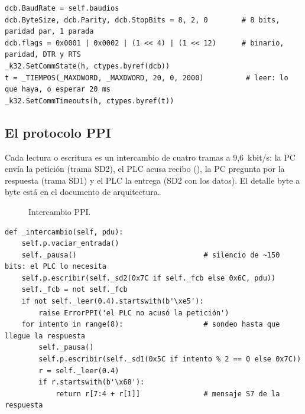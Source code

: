 \documentclass[a4paper,11pt]{article}
\begin{document}
\begin{lstlisting}[style=py, caption={Configuración del puerto en Windows por ctypes (\texttt{serie.py}).}]
dcb.BaudRate = self.baudios
dcb.ByteSize, dcb.Parity, dcb.StopBits = 8, 2, 0        # 8 bits, paridad par, 1 parada
dcb.flags = 0x0001 | 0x0002 | (1 << 4) | (1 << 12)      # binario, paridad, DTR y RTS
_k32.SetCommState(h, ctypes.byref(dcb))
t = _TIEMPOS(_MAXDWORD, _MAXDWORD, 20, 0, 2000)          # leer: lo que haya, o esperar 20 ms
_k32.SetCommTimeouts(h, ctypes.byref(t))
\end{lstlisting}

\subsection{El protocolo PPI}
Cada lectura o escritura es un intercambio de cuatro tramas a 9,6~kbit/s: la PC envía la petición (trama SD2), el PLC acusa recibo (), la PC pregunta por la respuesta (trama SD1) y el PLC la entrega (SD2 con los datos). El detalle byte a byte está en el documento de arquitectura.

\begin{figure}[H]
\centering
{}
\caption{Intercambio PPI.}
\end{figure}

\begin{lstlisting}[style=py, caption={Núcleo del intercambio (\texttt{ppi.py}).}]
def _intercambio(self, pdu):
    self.p.vaciar_entrada()
    self._pausa()                              # silencio de ~150 bits: el PLC lo necesita
    self.p.escribir(self._sd2(0x7C if self._fcb else 0x6C, pdu))
    self._fcb = not self._fcb
    if not self._leer(0.4).startswith(b'\xe5'):
        raise ErrorPPI('el PLC no acusó la petición')
    for intento in range(8):                   # sondeo hasta que llegue la respuesta
        self._pausa()
        self.p.escribir(self._sd1(0x5C if intento % 2 == 0 else 0x7C))
        r = self._leer(0.4)
        if r.startswith(b'\x68'):
            return r[7:4 + r[1]]               # mensaje S7 de la respuesta
\end{lstlisting}
\end{document}
